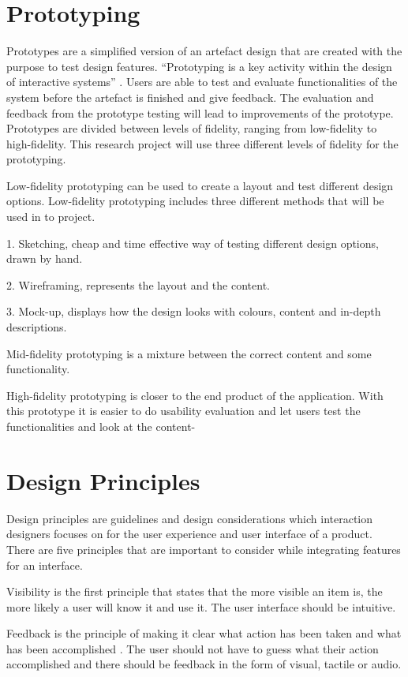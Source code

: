 \section{Prototyping}
Prototypes are a simplified version of an artefact design that are created with the purpose to test design features. “Prototyping is a key activity within the design of interactive systems” \cite{Buchenau}. Users are able to test and evaluate functionalities of the system before the artefact is finished and give feedback.  The evaluation and feedback from the prototype testing will lead to improvements of the prototype. Prototypes are divided between levels of fidelity, ranging from low-fidelity to high-fidelity. This research project will use three different levels of fidelity for the prototyping.

Low-fidelity prototyping \cite{interactiondesignbook} can be used to create a layout and test different design options. Low-fidelity prototyping includes three different methods that will be used in to project.

1. Sketching, cheap and time effective way of testing different design options, drawn by hand.

2. Wireframing, represents the layout and the content.

3. Mock-up, displays how the design looks with colours, content and in-depth descriptions.

Mid-fidelity prototyping is a mixture between the correct content and some functionality.

High-fidelity prototyping is closer to the end product of the application. With this prototype it is easier to do usability evaluation and let users test the functionalities and look at the content-

\section{Design Principles}
Design principles \cite{DesignP} are guidelines and design considerations which interaction designers focuses on for the user experience and user interface of a product. There are five principles that are important to consider while integrating features for an interface.

Visibility is the first principle that states that the more visible an item is, the more likely a user will know it and use it. \cite{Norman} The user interface should be intuitive.

Feedback is the principle of making it clear what action has been taken and what has been accomplished \cite{Norman}. The user should not have to guess what their action accomplished and there should be feedback in the form of visual, tactile or audio.

